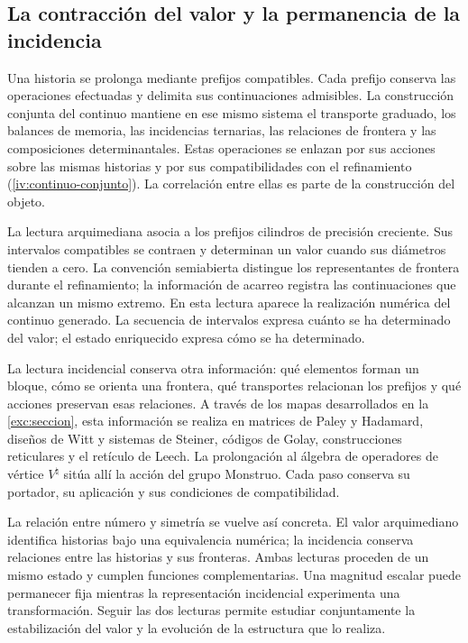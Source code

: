 \subsection*{La contracción del valor y la permanencia de la incidencia}
\label{libnar:continuo}

Una historia se prolonga mediante prefijos compatibles. Cada prefijo
conserva las operaciones efectuadas y delimita sus continuaciones
admisibles. La construcción conjunta del continuo mantiene en ese mismo
sistema el transporte graduado, los balances de memoria, las incidencias
ternarias, las relaciones de frontera y las composiciones
determinantales. Estas operaciones se enlazan por sus acciones sobre
las mismas historias y por sus compatibilidades con el refinamiento
(\cref{iv:continuo-conjunto}). La correlación entre ellas es parte de
la construcción del objeto.

La lectura arquimediana asocia a los prefijos cilindros de precisión
creciente. Sus intervalos compatibles se contraen y determinan un valor
cuando sus diámetros tienden a cero. La convención semiabierta distingue
los representantes de frontera durante el refinamiento; la información
de acarreo registra las continuaciones que alcanzan un mismo extremo.
En esta lectura aparece la realización numérica del continuo generado.
La secuencia de intervalos expresa cuánto se ha determinado del valor;
el estado enriquecido expresa cómo se ha determinado.

La lectura incidencial conserva otra información: qué elementos forman
un bloque, cómo se orienta una frontera, qué transportes relacionan los
prefijos y qué acciones preservan esas relaciones. A través de los mapas
desarrollados en la \cref{exc:seccion}, esta información se realiza en
matrices de Paley y Hadamard, diseños de Witt y sistemas de Steiner,
códigos de Golay, construcciones reticulares y el retículo de Leech.
La prolongación al álgebra de operadores de vértice \(V^\natural\)
sitúa allí la acción del grupo Monstruo. Cada paso conserva su portador,
su aplicación y sus condiciones de compatibilidad.

La relación entre número y simetría se vuelve así concreta. El valor
arquimediano identifica historias bajo una equivalencia numérica; la
incidencia conserva relaciones entre las historias y sus fronteras.
Ambas lecturas proceden de un mismo estado y cumplen funciones
complementarias. Una magnitud escalar puede permanecer fija mientras
la representación incidencial experimenta una transformación. Seguir
las dos lecturas permite estudiar conjuntamente la estabilización del
valor y la evolución de la estructura que lo realiza.

